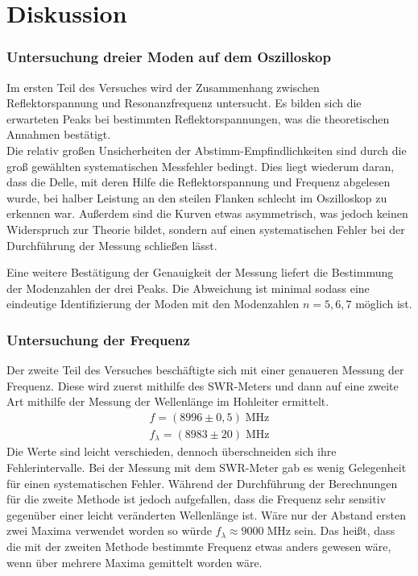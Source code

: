 \newpage
\section{Diskussion}
\label{sec:diskussion}
    \subsubsection*{Untersuchung dreier Moden auf dem Oszilloskop}
        Im ersten Teil des Versuches wird der Zusammenhang zwischen Reflektorspannung und Resonanzfrequenz untersucht.
        Es bilden sich die erwarteten Peaks bei bestimmten Reflektorspannungen, was die theoretischen Annahmen bestätigt. \\
        Die relativ großen Unsicherheiten der Abstimm-Empfindlichkeiten sind durch die groß gewählten systematischen Messfehler bedingt.
        Dies liegt wiederum daran, dass die Delle, mit deren Hilfe die Reflektorspannung und Frequenz abgelesen wurde, bei halber Leistung an den steilen Flanken schlecht im Oszilloskop zu erkennen war.
        Außerdem sind die Kurven etwas asymmetrisch, was jedoch keinen Widerspruch zur Theorie bildet, sondern auf einen systematischen Fehler bei der Durchführung der Messung schließen lässt.

        Eine weitere Bestätigung der Genauigkeit der Messung liefert die Bestimmung der Modenzahlen der drei Peaks. Die Abweichung ist minimal sodass eine eindeutige Identifizierung der Moden mit den Modenzahlen $n = 5, 6, 7$ möglich ist.

    \subsubsection*{Untersuchung der Frequenz}
        Der zweite Teil des Versuches beschäftigte sich mit einer genaueren Messung der Frequenz.
        Diese wird zuerst mithilfe des SWR-Meters und dann auf eine zweite Art mithilfe der Messung der Wellenlänge im Hohleiter ermittelt.
        \begin{align*}
            f = (8996 \pm 0,5) \; \mathrm{MHz} \\
            f_{\lambda} = (8983 \pm 20) \; \mathrm{MHz}
        \end{align*}
        Die Werte sind leicht verschieden, dennoch überschneiden sich ihre Fehlerintervalle.
        Bei der Messung mit dem SWR-Meter gab es wenig Gelegenheit für einen systematischen Fehler.
        Während der Durchführung der Berechnungen für die zweite Methode ist jedoch aufgefallen, dass die Frequenz sehr sensitiv gegenüber einer leicht veränderten Wellenlänge ist. Wäre nur der Abstand ersten zwei Maxima verwendet worden so würde $f_{\lambda} \approx 9000\;$MHz sein. Das heißt, dass die mit der zweiten Methode bestimmte Frequenz etwas anders gewesen wäre, wenn über mehrere Maxima gemittelt worden wäre.

